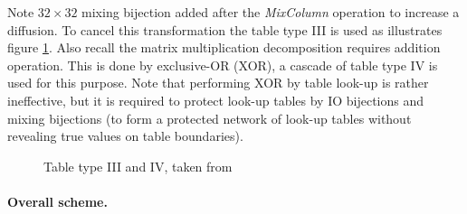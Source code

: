 \documentclass[11pt,oneside,final]{fithesis2}
\begin{document}
    Note $32\times32$ mixing bijection added after the \emph{MixColumn} operation to increase a diffusion. To cancel this transformation the table 
    type III is used as illustrates figure \ref{fig:aes_t3_t4}. Also recall the matrix multiplication decomposition requires addition operation. This is done
    by exclusive-OR (XOR), a cascade of table type IV is used for this purpose. Note that performing XOR by table look-up is rather ineffective, but it is required to 
    protect look-up tables by IO bijections and mixing bijections (to form a protected network of look-up tables without revealing true values on 
    table boundaries).
    
    \begin{figure}[!htb]
    \begin{center}
    \leavevmode
    \centerline{}
    \end{center}
    \caption{Table type III and IV, taken from~\citep{wyseurPhd}}
    \label{fig:aes_t3_t4}
    \end{figure}
        

    \paragraph*{Overall scheme.}
    
\end{document}

